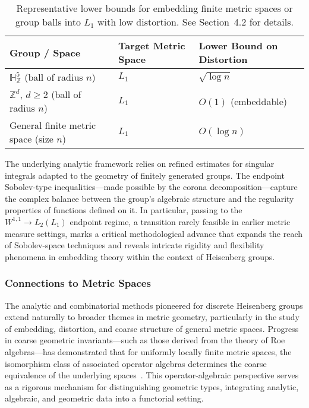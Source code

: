 \begin{table*}[htbp]
\centering
\caption{Representative lower bounds for embedding finite metric spaces or group balls into $L_1$ with low distortion. See Section~4.2 for details.}
\label{tab:embedding_bounds}
\begin{adjustbox}{max width=\textwidth}
\begin{tabular}{lll}
\toprule
\textbf{Group / Space} & \textbf{Target Metric Space} & \textbf{Lower Bound on Distortion}\\
\midrule
$\mathbb{H}^5_{\mathbb{Z}}$ (ball of radius $n$) & $L_1$ & $\sqrt{\log n}$\\
$\mathbb{Z}^d$, $d\geq 2$ (ball of radius $n$) & $L_1$ & $O(1)$ (embeddable)\\
General finite metric space (size $n$) & $L_1$ & $O(\log n)$\\
\bottomrule
\end{tabular}
\end{adjustbox}
\end{table*}

The underlying analytic framework relies on refined estimates for singular integrals adapted to the geometry of finitely generated groups. The endpoint Sobolev-type inequalities—made possible by the corona decomposition—capture the complex balance between the group's algebraic structure and the regularity properties of functions defined on it. In particular, passing to the $W^{1,1} \rightarrow L_2(L_1)$ endpoint regime, a transition rarely feasible in earlier metric measure settings, marks a critical methodological advance that expands the reach of Sobolev-space techniques and reveals intricate rigidity and flexibility phenomena in embedding theory within the context of Heisenberg groups.

\subsubsection{Connections to Metric Spaces}

The analytic and combinatorial methods pioneered for discrete Heisenberg groups extend naturally to broader themes in metric geometry, particularly in the study of embedding, distortion, and coarse structure of general metric spaces. Progress in coarse geometric invariants—such as those derived from the theory of Roe algebras—has demonstrated that for uniformly locally finite metric spaces, the isomorphism class of associated operator algebras determines the coarse equivalence of the underlying spaces~\cite{ref51}. This operator-algebraic perspective serves as a rigorous mechanism for distinguishing geometric types, integrating analytic, algebraic, and geometric data into a functorial setting.


